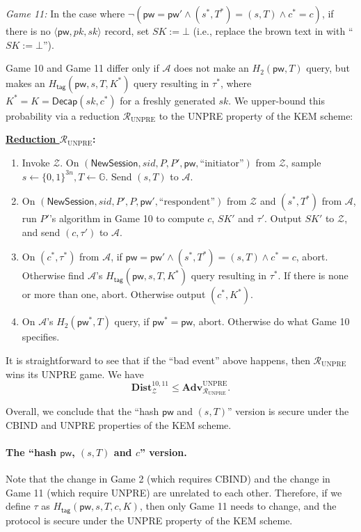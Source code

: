 \documentclass{article}
\theoremstyle{plain}
\theoremstyle{definition}
\theoremstyle{remark}
\newcommand{\group}{\mathbb{G}}
\newcommand{\adv}{\mathcal{A}}
\newcommand{\env}{\mathcal{Z}}
\newcommand{\red}{\mathcal{R}}
\newcommand{\Adv}{\mathbf{Adv}}
\newcommand{\Dist}{\mathbf{Dist}}
\newcommand{\Decap}{\mathsf{Decap}}
\newcommand{\Htag}{H_\mathsf{tag}}
\newcommand{\pw}{\mathsf{pw}}
\newcommand{\NewSession}{\mathsf{NewSession}}
\begin{document}
\medskip\noindent\emph{Game 11:} In the case where $\neg(\pw = \pw' \land (s^*,T^*) = (s,T) \land c^* = c)$, if there is no $\langle\pw,pk,sk\rangle$ record, set $SK := \bot$ (i.e., replace the {\color{brown}brown} text in  with ``$SK := \bot$'').

Game 10 and Game 11 differ only if $\adv$ does not make an $H_2(\pw,T)$ query, but makes an $\Htag(\pw,s,T,K^*)$ query resulting in $\tau^*$, where $K^* = K = \Decap(sk,c^*)$ for a freshly generated $sk$. We upper-bound this probability via a reduction $\red_\text{UNPRE}$ to the UNPRE property of the KEM scheme:

\medskip\noindent\textbf{\underline{Reduction $\red_\mathrm{UNPRE}$}:}

\medskip\noindent
\begin{enumerate}
  \item Invoke $\env$. On $(\NewSession, sid, P, P', \pw, \text{``initiator''})$ from $\env$, sample $s \gets \{0,1\}^{3n}, T \gets \group$. Send $(s,T)$ to $\adv$.
  \item On $(\NewSession, sid, P', P, \pw', \text{``respondent''})$ from $\env$ and $(s^*,T^*)$ from $\adv$, run $P'$'s algorithm in Game 10 to compute $c$, $SK'$ and $\tau'$. Output $SK'$ to $\env$, and send $(c,\tau')$ to $\adv$.
  \item On $(c^*,\tau^*)$ from $\adv$, if $\pw = \pw' \land (s^*,T^*) = (s,T) \land c^* = c$, abort. Otherwise find $\adv$'s $\Htag(\pw,s,T,K^*)$ query resulting in $\tau^*$. If there is none or more than one, abort. Otherwise output $(c^*,K^*)$.
  \item On $\adv$'s $H_2(\pw^*,T)$ query, if $\pw^* = \pw$, abort. Otherwise do what Game 10 specifies.
\end{enumerate}

It is straightforward to see that if the ``bad event'' above happens, then $\red_\mathrm{UNPRE}$ wins its UNPRE game. We have
\[
\Dist_\env^{10,11} \leq \Adv_{\red_\text{UNPRE}}^\text{UNPRE}.
\]

Overall, we conclude that the ``hash $\pw$ and $(s,T)$'' version is secure under the CBIND and UNPRE properties of the KEM scheme.

\paragraph{The ``hash $\pw$, $(s,T)$ and $c$'' version.}
Note that the change in Game 2 (which requires CBIND) and the change in Game 11 (which require UNPRE) are unrelated to each other. Therefore, if we define $\tau$ as $\Htag(\pw,s,T,c,K)$, then only Game 11 needs to change, and the protocol is secure under the UNPRE property of the KEM scheme.
\end{document}
